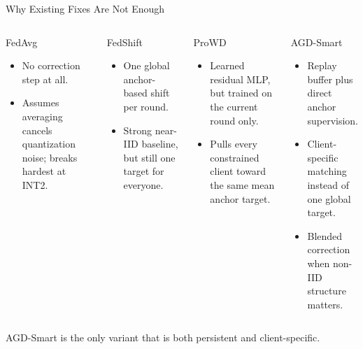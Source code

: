\documentclass[aspectratio=169,11pt]{beamer}
\begin{document}
\begin{frame}{Why Existing Fixes Are Not Enough}
\small
\begin{columns}[T,totalwidth=\textwidth]
\begin{block}{FedAvg}
\begin{itemize}
  \item No correction step at all.
  \item Assumes averaging cancels quantization noise; breaks hardest at INT2.
\end{itemize}
\end{block}

\vspace{0.2em}
\begin{block}{FedShift}
\begin{itemize}
  \item One global anchor-based shift per round.
  \item Strong near-IID baseline, but still one target for everyone.
\end{itemize}
\end{block}

\begin{block}{ProWD}
\begin{itemize}
  \item Learned residual MLP, but trained on the current round only.
  \item Pulls every constrained client toward the same mean anchor target.
\end{itemize}
\end{block}

\vspace{0.2em}
\begin{block}{AGD-Smart}
\begin{itemize}
  \item Replay buffer plus direct anchor supervision.
  \item Client-specific matching instead of one global target.
  \item Blended correction when non-IID structure matters.
\end{itemize}
\end{block}
\end{columns}

\vspace{0.2em}
\centering
\footnotesize AGD-Smart is the only variant that is both persistent and
client-specific.
\end{frame}
\end{document}
